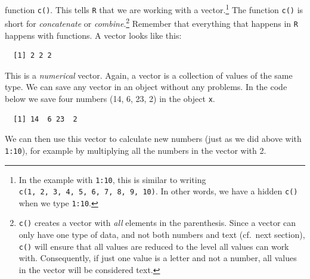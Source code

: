 \documentclass[12pt,oneside]{reedthesis}
\theoremstyle{definition}
\theoremstyle{definition}
\theoremstyle{definition}
\theoremstyle{remark}
\begin{document}
  function \texttt{c()}. This tells \texttt{R} that we are working with a
  vector.\footnote{In the example with \texttt{1:10}, this is similar to
    writing \texttt{c(1,\ 2,\ 3,\ 4,\ 5,\ 6,\ 7,\ 8,\ 9,\ 10)}. In other
    words, we have a hidden \texttt{c()} when we type \texttt{1:10}.} The
  function \texttt{c()} is short for \emph{concatenate} or
  \emph{combine}.\footnote{\texttt{c()} creates a vector with \emph{all}
    elements in the parenthesis. Since a vector can only have one type of
    data, and not both numbers and text (cf.~next section), \texttt{c()}
    will ensure that all values are reduced to the level all values can
    work with. Consequently, if just one value is a letter and not a
    number, all values in the vector will be considered text.} Remember
  that everything that happens in \texttt{R} happens with functions. A
  vector looks like this:
  \begin{Shaded}
  \begin{Highlighting}[]
  \NormalTok{(}\NormalTok{, }\NormalTok{, }\NormalTok{)}
  \end{Highlighting}
  \end{Shaded}
  \begin{verbatim}
  [1] 2 2 2
  \end{verbatim}
  This is a \emph{numerical} vector. Again, a vector is a collection of
  values of the same type. We can save any vector in an object without any
  problems. In the code below we save four numbers (14, 6, 23, 2) in the
  object \texttt{x}.
  \begin{Shaded}
  \begin{Highlighting}[]
  \StringTok{ }\NormalTok{(}\NormalTok{, }\NormalTok{, }\NormalTok{, }\NormalTok{)}
  \end{Highlighting}
  \end{Shaded}
  \begin{verbatim}
  [1] 14  6 23  2
  \end{verbatim}
  We can then use this vector to calculate new numbers (just as we did
  above with \texttt{1:10}), for example by multiplying all the numbers in
  the vector with 2.
  \begin{Shaded}
  \begin{Highlighting}[]
  \OperatorTok{*}\StringTok{ }
  \end{Highlighting}
  \end{Shaded}
\end{document}
